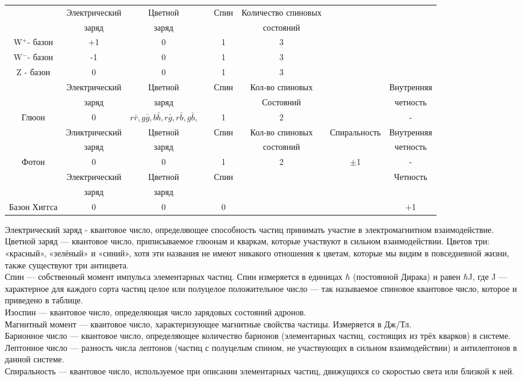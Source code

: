 \documentclass[a4paper,14pt]{article}
\begin{document}
\begin{scriptsize}
\begin{center}
\begin{tabular}{cccccccc}
\hline
& Электрический & Цветной && Спин & Количество спиновых  \\
& заряд & заряд &&& состояний\\
W$^+$- базон & +1& 0&& 1&3\\
W$^-$- базон& -1 &0 &&1&3\\
Z -  базон&0 &0 && 1&3\\
\hline
& Электрический &Цветной&& Спин &Кол-во спиновых&& Внутренняя\\
& заряд &заряд&& & Состояний&& четность \\
Глюон& 0& $r\bar r, g\bar g, b\bar b, r\bar g, r\bar b, g\bar b$,&& 1& 2&& -
\\
\hline
&Эликтрический& Цветной&& Спин& Кол-во спиновых& Спиральность& Внутренняя\\
&заряд& заряд&&& состояний&&четность\\
Фотон &0& 0&& 1& 2& $\pm$1& -
\\
\hline
&Электрический& Цветной&& Спин&&& Четность\\
&заряд& заряд\\
Базон Хиггса &0& 0&& 0&&& +1\\
\hline
\end{tabular}
\end{center}
\end{scriptsize}

Электрический заряд - квантовое число, определяющее способность частиц принимать участие в электромагнитном взаимодействие.\\
Цветной заряд — квантовое число, приписываемое глюонам и кваркам, которые участвуют в сильном взаимодействии. Цветов три: «красный», «зелёный» и «синий», хотя эти названия не имеют никакого отношения к цветам, которые мы видим в повседневной жизни, также существуют три антицвета.\\
Спин — собственный момент импульса элементарных частиц. Спин измеряется в единицах $\hbar$ (постоянной Дирака) и равен $\hbar$J, где J — характерное для каждого сорта частиц целое или полуцелое положительное число — так называемое спиновое квантовое число, которое и приведено в таблице.\\
Изоспин — квантовое число, определяющая число зарядовых состояний адронов.\\
Магнитный момент — квантовое число, характеризующее магнитные свойства частицы. Измеряется в Дж/Тл.\\
Барионное число — квантовое число, определяющее количество барионов (элементарных частиц, состоящих из трёх кварков) в системе.\\
Лептонное число — разность числа лептонов (частиц с полуцелым спином, не участвующих в сильном взаимодействии) и антилептонов в данной системе.\\
Спиральность — квантовое число, используемое при описании элементарных частиц, движущихся со скоростью света или близкой к ней.
\end{document}
